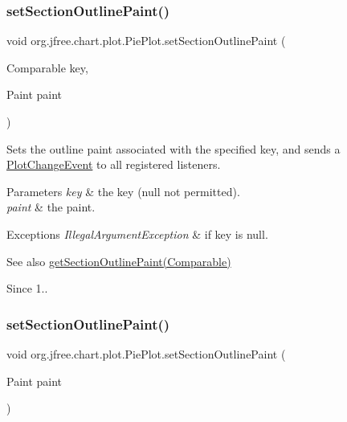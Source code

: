 \subsubsection{\texorpdfstring{set\+Section\+Outline\+Paint()}{setSectionOutlinePaint()}\hspace{0.1cm}{\footnotesize\ttfamily [1/3]}}
{\footnotesize\ttfamily void org.\+jfree.\+chart.\+plot.\+Pie\+Plot.\+set\+Section\+Outline\+Paint (\begin{DoxyParamCaption}\item[{Comparable}]{key,  }\item[{Paint}]{paint }\end{DoxyParamCaption})}

Sets the outline paint associated with the specified key, and sends a \mbox{\hyperlink{}{Plot\+Change\+Event}} to all registered listeners.


\begin{DoxyParams}{Parameters}
{\em key} & the key ({\ttfamily null} not permitted). \\
\hline
{\em paint} & the paint.\\
\hline
\end{DoxyParams}

\begin{DoxyExceptions}{Exceptions}
{\em Illegal\+Argument\+Exception} & if {\ttfamily key} is {\ttfamily null}.\\
\hline
\end{DoxyExceptions}
\begin{DoxySeeAlso}{See also}
\mbox{\hyperlink{classorg_1_1jfree_1_1chart_1_1plot_1_1_pie_plot_ad5075d6d33c6dfbaab396a2b4a6b45bf}{get\+Section\+Outline\+Paint(\+Comparable)}}
\end{DoxySeeAlso}
\begin{DoxySince}{Since}
1.. 
\end{DoxySince}
\mbox{\label{classorg_1_1jfree_1_1chart_1_1plot_1_1_pie_plot_ae573b32fba1d3c66a0e25516f5e6da16}} 
\subsubsection{\texorpdfstring{set\+Section\+Outline\+Paint()}{setSectionOutlinePaint()}\hspace{0.1cm}{\footnotesize\ttfamily [2/3]}}
{\footnotesize\ttfamily void org.\+jfree.\+chart.\+plot.\+Pie\+Plot.\+set\+Section\+Outline\+Paint (\begin{DoxyParamCaption}\item[{Paint}]{paint }\end{DoxyParamCaption})}

